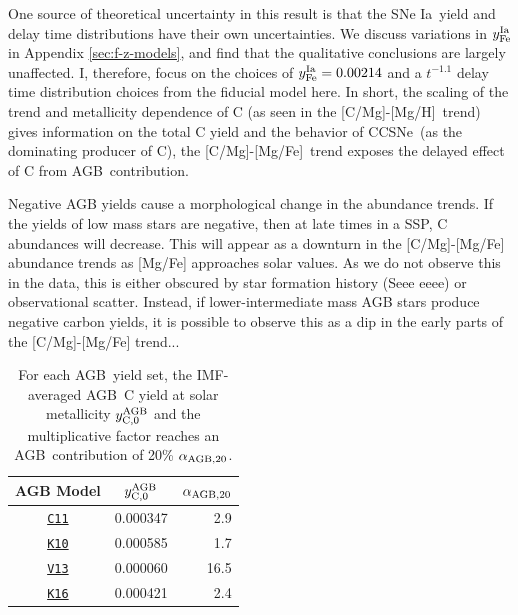 \documentclass[fleqn,usenatbib]{mnras}
\newcommand{\cxi}{\texttt{\hyperlink{C11}{C11}}}
\newcommand{\kx}{\texttt{\hyperlink{K10}{K10}}}
\newcommand{\kxvi}{\texttt{\hyperlink{K16}{K16}}}
\newcommand{\vxiii}{\texttt{\hyperlink{V13}{V13}}}
\newcommand{\cc}{CCSNe}
\newcommand{\agb}{AGB}
\newcommand{\ia}{SNe Ia}
\newcommand{\imf}{IMF}
\newcommand{\caah}{[C/Mg]-[Mg/H]}
\newcommand{\caafe}{[C/Mg]-[Mg/Fe]}
\begin{document}
One source of theoretical uncertainty in this result is that the \ia\ yield and delay time distributions have their own uncertainties. We discuss variations in $y_{\rm Fe}^{\rm Ia}$ in Appendix \ref{sec:f-z-models}, and find that the qualitative conclusions are largely unaffected. I, therefore, focus on the choices of $y_{\rm Fe}^{\rm Ia} = 0.00214$ and a $t^{-1.1}$ delay time distribution choices from the fiducial model here.
In short, the scaling of the trend and metallicity dependence of C (as seen in
the \caah\ trend) gives information on the total C yield and the behavior of \cc\ (as the dominating producer of C), the \caafe\ trend exposes the delayed effect of C from \agb\ contribution.


Negative AGB yields cause a morphological change in the abundance trends. If the yields of low mass stars are negative, then at late times in a SSP, C abundances will decrease. This will appear as a downturn in the \caafe{} abundance trends as [Mg/Fe] approaches solar values. As we do not observe this in the data, this is either obscured by star formation history (Seee eeee) or observational scatter. 
Instead, if lower-intermediate mass AGB stars produce negative carbon yields, it is possible to observe this as a dip in the early parts of the \caafe{} trend...

\begin{table}
	\centering
    \caption[Low-Mass Stellar Carbon Yields at Solar Metallicity]{For each \agb\ yield set, the \imf-averaged \agb\ C yield at solar metallicity $y_{\rm C, 0}^{\rm AGB}$ and the multiplicative factor reaches an \agb\ contribution of 20\% $\alpha_{\rm AGB, 20}$.}
	\label{tab:alpha_agb}
	\begin{tabular}{ccr} %
		\hline 
		AGB Model & $y_{\rm C, 0}^{\rm AGB}$ & $\alpha_{\rm AGB, 20}$\\
        \hline
        \cxi & 0.000347 & 2.9\\
        \kx & 0.000585 & 1.7\\
        \vxiii & 0.000060 & 16.5\\
        \kxvi & 0.000421 & 2.4\\
		\hline
	\end{tabular}
\end{table}
\end{document}
